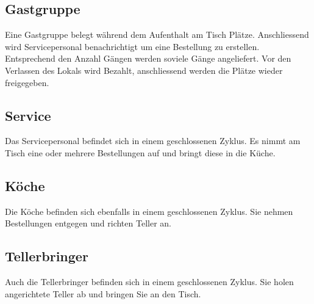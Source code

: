 \documentclass[ngerman,a4paper,12pt]{scrreprt}
\begin{document}
		\subsection{Gastgruppe}
		Eine Gastgruppe belegt während dem Aufenthalt am Tisch Plätze. Anschliessend wird Servicepersonal benachrichtigt um eine Bestellung zu erstellen.
		Entsprechend den Anzahl Gängen werden soviele Gänge angeliefert.
		Vor den Verlassen des Lokals wird Bezahlt, anschliessend werden die Plätze wieder freigegeben.
		
		\subsection{Service}
		Das Servicepersonal befindet sich in einem geschlossenen Zyklus. Es nimmt am Tisch eine oder mehrere Bestellungen auf und bringt diese in die Küche.
		
		\subsection{Köche}
		Die Köche befinden sich ebenfalls in einem geschlossenen Zyklus. Sie nehmen Bestellungen entgegen und richten Teller an.
		
		\subsection{Tellerbringer}
		Auch die Tellerbringer befinden sich in einem geschlossenen Zyklus. Sie holen angerichtete Teller ab und bringen Sie an den Tisch.
		
\end{document}
